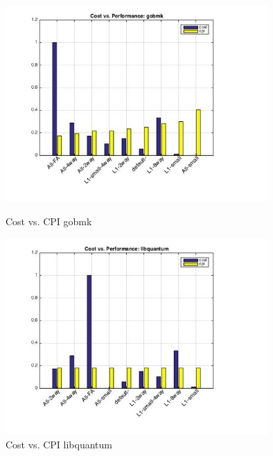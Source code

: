 \documentclass[11pt,titlepage]{article}
\begin{document}
\begin{figure}[H]
  \centering
  \begin{minipage}{.5\textwidth}
    \centering
    \includegraphics[width=10cm]{cvpgobmk}
    \caption{Cost vs. CPI gobmk}
    \label{fig:cvpgobmk}
  \end{minipage}%
  \begin{minipage}{.5\textwidth}
    \centering
    \includegraphics[width=10cm]{cvplibquantum}
    \caption{Cost vs. CPI libquantum}
    \label{fig:cvplibquantum}
  \end{minipage}
\end{figure}
\end{document}
